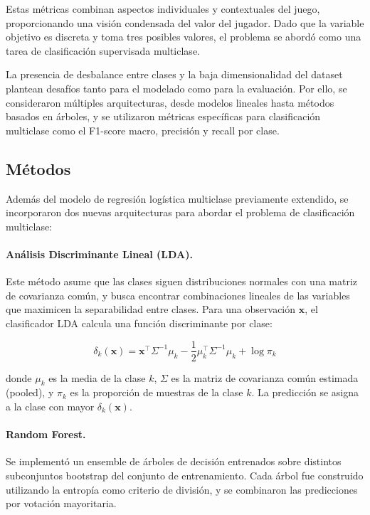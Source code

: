 \documentclass[11pt]{article}
\begin{document}
Estas métricas combinan aspectos individuales y contextuales del juego, proporcionando una visión condensada del valor del jugador. Dado que la variable objetivo es discreta y toma tres posibles valores, el problema se abordó como una tarea de clasificación supervisada multiclase.

La presencia de desbalance entre clases y la baja dimensionalidad del dataset plantean desafíos tanto para el modelado como para la evaluación. Por ello, se consideraron múltiples arquitecturas, desde modelos lineales hasta métodos basados en árboles, y se utilizaron métricas específicas para clasificación multiclase como el F1-score macro, precisión y recall por clase.



\subsection{Métodos}

Además del modelo de regresión logística multiclase previamente extendido, se incorporaron dos nuevas arquitecturas para abordar el problema de clasificación multiclase:

\paragraph{Análisis Discriminante Lineal (LDA).}
Este método asume que las clases siguen distribuciones normales con una matriz de covarianza común, y busca encontrar combinaciones lineales de las variables que maximicen la separabilidad entre clases. Para una observación $\mathbf{x}$, el clasificador LDA calcula una función discriminante por clase:

\[
\delta_k(\mathbf{x}) = \mathbf{x}^\top \Sigma^{-1} \mu_k - \frac{1}{2} \mu_k^\top \Sigma^{-1} \mu_k + \log \pi_k
\]

donde $\mu_k$ es la media de la clase $k$, $\Sigma$ es la matriz de covarianza común estimada (pooled), y $\pi_k$ es la proporción de muestras de la clase $k$. La predicción se asigna a la clase con mayor $\delta_k(\mathbf{x})$.

\paragraph{Random Forest.}
Se implementó un ensemble de árboles de decisión entrenados sobre distintos subconjuntos bootstrap del conjunto de entrenamiento. Cada árbol fue construido utilizando la entropía como criterio de división, y se combinaron las predicciones por votación mayoritaria.
\end{document}
